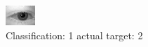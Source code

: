 \begin{figure}[h!]
\begin{center}
\includegraphics[width=0.60\columnwidth]{figures/ID349_class_1_target_2.png}
\end{center}
\caption{ Classification: 1 actual target: 2}
\label{fig:ID349_class_1_target_2}
\end{figure}
